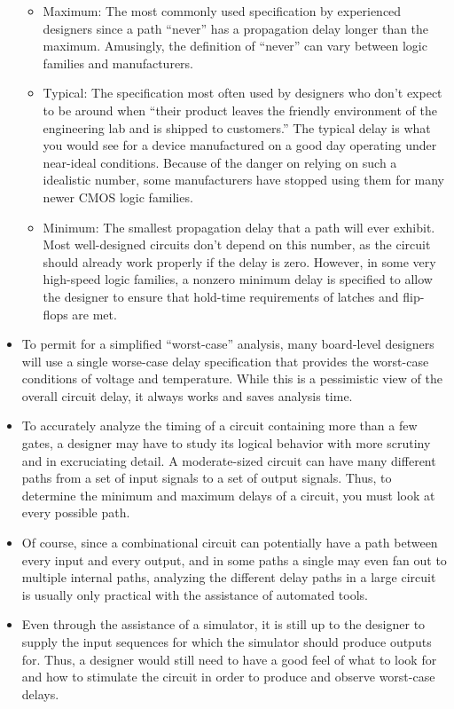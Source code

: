 \documentclass[10pt,a4paper]{article}
\begin{document}
\begin{itemize}
\begin{itemize}
\item Maximum: The most commonly used specification by experienced designers since a path ``never'' has a propagation delay longer than the maximum. Amusingly, the definition of ``never'' can vary between logic families and manufacturers. 
\item Typical: The specification most often used by designers who don't expect to be around when ``their product leaves the friendly environment of the engineering lab and is shipped to customers.'' The typical delay is what you would see for a device manufactured on a good day operating under near-ideal conditions. Because of the danger on relying on such a idealistic number, some manufacturers have stopped using them for many newer CMOS logic families.
\item Minimum: The smallest propagation delay that a path will ever exhibit. Most well-designed circuits don't depend on this number, as the circuit should already work properly if the delay is zero. However, in some very high-speed logic families, a nonzero minimum delay is specified to allow the designer to ensure that hold-time requirements of latches and flip-flops are met.
\end{itemize}
\item To permit for a simplified ``worst-case'' analysis, many board-level designers will use a single worse-case delay specification that provides the worst-case conditions of voltage and temperature. While this is a pessimistic view of the overall circuit delay, it always works and saves analysis time.
\item To accurately analyze the timing of a circuit containing more than a few gates, a designer may have to study its logical behavior with more scrutiny and in excruciating detail. A moderate-sized circuit can have many different paths from a set of input signals to a set of output signals. Thus, to determine the minimum and maximum delays of a circuit, you must look at every possible path.
\item Of course, since a combinational circuit can potentially have a path between every input and every output, and in some paths a single may even fan out to multiple internal paths, analyzing the different delay paths in a large circuit is usually only practical with the assistance of automated tools. 
\item Even through the assistance of a simulator, it is still up to the designer to supply the input sequences for which the simulator should produce outputs for. Thus, a designer would still need to have a good feel of what to look for and how to stimulate the circuit in order to produce and observe worst-case delays. 

\end{itemize}
\end{document}
